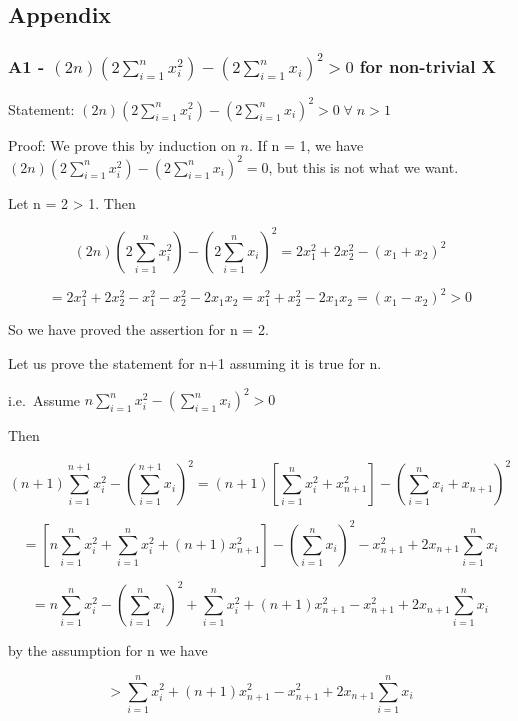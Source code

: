 \documentclass[11pt]{article}
\begin{document}
    \hypertarget{appendix}{%
\subsection{Appendix}\label{appendix}}

    \hypertarget{a1---2n-2-sum_i1n-x_i2---2-sum_i1n-x_i2-0-for-non-trivial-x}{%
\subsubsection{\texorpdfstring{A1 -
\((2n) (2 \sum_{i=1}^n x_i^2) - (2 \sum_{i=1}^n x_i)^2 > 0\) for
non-trivial
X}{A1 - (2n) (2 \textbackslash{}sum\_\{i=1\}\^{}n x\_i\^{}2) - (2 \textbackslash{}sum\_\{i=1\}\^{}n x\_i)\^{}2 \textgreater{} 0 for non-trivial X}}\label{a1---2n-2-sum_i1n-x_i2---2-sum_i1n-x_i2-0-for-non-trivial-x}}

Statement:
\((2n) (2 \sum_{i=1}^n x_i^2) - (2 \sum_{i=1}^n x_i)^2 > 0 \; \forall \; n > 1\)

Proof: We prove this by induction on \(n\). If n = 1, we have
\((2n) (2 \sum_{i=1}^n x_i^2) - (2 \sum_{i=1}^n x_i)^2 = 0\), but this
is not what we want.

Let n = 2 \textgreater{} 1. Then

\[(2n) (2 \sum_{i=1}^n x_i^2) - (2 \sum_{i=1}^n x_i)^2 = 2 x_1^2 + 2 x_2^2 - (x_1 + x_2)^2\]

\[= 2 x_1^2 + 2 x_2^2 - x_1^2 - x_2^2 - 2x_1 x_2 = x_1^2 + x_2^2 - 2x_1 x_2 = (x_1 - x_2)^2  > 0\]

So we have proved the assertion for n = 2.

Let us prove the statement for n+1 assuming it is true for n.

i.e.~Assume \(n \sum_{i=1}^n x_i^2 - (\sum_{i=1}^n x_i)^2 > 0\)

Then

\[(n+1) \sum_{i=1}^{n+1} x_i^2 - (\sum_{i=1}^{n+1} x_i)^2 = (n+1)[\sum_{i=1}^{n} x_i^2 + x_{n+1}^2] - (\sum_{i=1}^{n} x_i + x_{n+1})^2\]

\[= [n \sum_{i=1}^n x_i^2 + \sum_{i=1}^n x_i^2 + (n+1)x_{n+1}^2] - (\sum_{i=1}^n x_i)^2 - x_{n+1}^2 + 2x_{n+1} \sum_{i=1}^n x_i\]

\[= n \sum_{i=1}^n x_i^2 - (\sum_{i=1}^n x_i)^2 + \sum_{i=1}^n x_i^2 + (n+1)x_{n+1}^2 - x_{n+1}^2 + 2x_{n+1} \sum_{i=1}^n x_i\]

by the assumption for n we have

\[> \sum_{i=1}^n x_i^2 + (n+1)x_{n+1}^2 - x_{n+1}^2 + 2x_{n+1} \sum_{i=1}^n x_i\]
\end{document}
